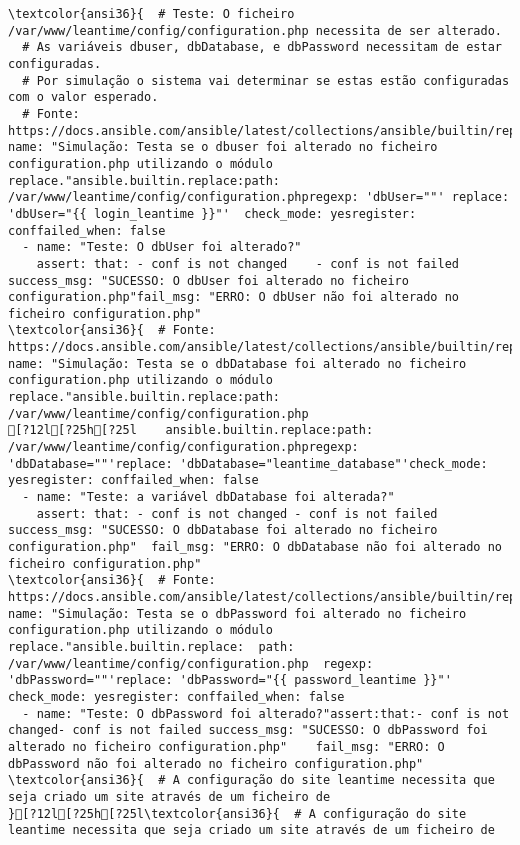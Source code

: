 \documentclass{scrartcl}
\begin{document}
\begin{Verbatim}
\textcolor{ansi36}{  # Teste: O ficheiro /var/www/leantime/config/configuration.php necessita de ser alterado.
  # As variáveis dbuser, dbDatabase, e dbPassword necessitam de estar configuradas.
  # Por simulação o sistema vai determinar se estas estão configuradas com o valor esperado.
  # Fonte: https://docs.ansible.com/ansible/latest/collections/ansible/builtin/replace_module.html}- name: "Simulação: Testa se o dbuser foi alterado no ficheiro configuration.php utilizando o módulo replace."ansible.builtin.replace:path: /var/www/leantime/config/configuration.phpregexp: 'dbUser=""' replace: 'dbUser="{{ login_leantime }}"'  check_mode: yesregister: conffailed_when: false
  - name: "Teste: O dbUser foi alterado?"
    assert: that: - conf is not changed    - conf is not failed  success_msg: "SUCESSO: O dbUser foi alterado no ficheiro configuration.php"fail_msg: "ERRO: O dbUser não foi alterado no ficheiro configuration.php"
\textcolor{ansi36}{  # Fonte: https://docs.ansible.com/ansible/latest/collections/ansible/builtin/replace_module.html}- name: "Simulação: Testa se o dbDatabase foi alterado no ficheiro configuration.php utilizando o módulo replace."ansible.builtin.replace:path: /var/www/leantime/config/configuration.php
[?12l[?25h[?25l    ansible.builtin.replace:path: /var/www/leantime/config/configuration.phpregexp: 'dbDatabase=""'replace: 'dbDatabase="leantime_database"'check_mode: yesregister: conffailed_when: false
  - name: "Teste: a variável dbDatabase foi alterada?"
    assert: that: - conf is not changed - conf is not failed    success_msg: "SUCESSO: O dbDatabase foi alterado no ficheiro configuration.php"  fail_msg: "ERRO: O dbDatabase não foi alterado no ficheiro configuration.php"
\textcolor{ansi36}{  # Fonte: https://docs.ansible.com/ansible/latest/collections/ansible/builtin/replace_module.html}- name: "Simulação: Testa se o dbPassword foi alterado no ficheiro configuration.php utilizando o módulo replace."ansible.builtin.replace:  path: /var/www/leantime/config/configuration.php  regexp: 'dbPassword=""'replace: 'dbPassword="{{ password_leantime }}"'  check_mode: yesregister: conffailed_when: false
  - name: "Teste: O dbPassword foi alterado?"assert:that:- conf is not changed- conf is not failed success_msg: "SUCESSO: O dbPassword foi alterado no ficheiro configuration.php"    fail_msg: "ERRO: O dbPassword não foi alterado no ficheiro configuration.php"
\textcolor{ansi36}{  # A configuração do site leantime necessita que seja criado um site através de um ficheiro de
}[?12l[?25h[?25l\textcolor{ansi36}{  # A configuração do site leantime necessita que seja criado um site através de um ficheiro de

\end{Verbatim}
\end{document}
